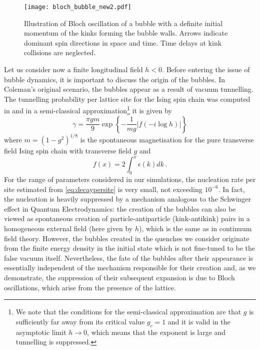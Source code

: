 \documentclass[amsmath,amssymb,11pt]{article}
\numberwithin{equation}{section}
\numberwithin{figure}{section}
\numberwithin{table}{section}
\begin{document}
\begin{figure}
\centering 
\texttt{[image: bloch\_bubble\_new2.pdf]}
\caption{\label{fig:bloch-bubble-with-spins}  Illustration of Bloch oscillation of a bubble with a definite initial momentum of the kinks forming the bubble walls.  Arrows indicate  dominant spin directions in space and time.  Time delays at kink collisions are neglected.} 
\end{figure}

{Let us consider now a finite longitudinal field $h<0$. Before entering the issue of bubble dynamics, it is important to discuss the origin of the bubbles. In Coleman's original scenario, the bubbles appear as a result of vacuum tunnelling. The tunnelling probability per lattice site for the Ising spin chain was computed in \cite{1999PhRvB..6014525R} and in a semi-classical approximation\footnote{We note that the conditions for the semi-classical approximation are that $g$ is sufficiently far away from its critical value $g_c=1$ and it is valid in the asymptotic limit $h\rightarrow 0$, which means that the exponent is large and tunnelling is suppressed.} it is given by 
\begin{equation}
    \gamma=\frac{\pi g m}{9} \exp\left\{- \frac{1}{m g}\left|f\left(-i\log h\right)\right|\right\}
\label{eq:decaypersite}\end{equation}
where $m=(1-g^2)^{1/8}$ is the spontaneous magnetisation for the pure transverse field Ising spin chain with transverse field $g$ and 
\begin{equation}
f(x)=2\int_0^x \epsilon(k)dk\,.
\label{eq:ffunction}\end{equation}
For the range of parameters considered in our simulations, the nucleation rate per site estimated from \eqref{eq:decaypersite} is very small, not exceeding $10^{-6}$. In fact, the nucleation is heavily suppressed by a mechanism analogous to the Schwinger effect \cite{PhysRev.82.664} in Quantum Electrodynamics: the creation of the bubbles can also be viewed as spontaneous creation of particle-antiparticle (kink-antikink) pairs in a homogeneous external field (here given by $h$), which is the same as in continuum field theory. However, the bubbles created in the quenches we consider originate from the finite energy density in the initial state which is not fine-tuned to be the false vacuum itself. Nevertheless, the fate of the bubbles after their appearance is essentially independent of the mechanism responsible for their creation and, as we demonstrate, the suppression of their subsequent expansion is due to Bloch oscillations, which arise from the presence of the lattice.}
\end{document}
